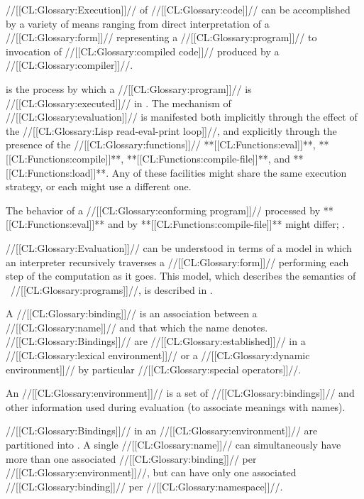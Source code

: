 


//[[CL:Glossary:Execution]]// of //[[CL:Glossary:code]]// can be accomplished by a variety of means ranging
from direct interpretation of a //[[CL:Glossary:form]]// representing a //[[CL:Glossary:program]]//
to invocation of //[[CL:Glossary:compiled code]]// produced by a //[[CL:Glossary:compiler]]//.
 
 is the process by which a //[[CL:Glossary:program]]// is //[[CL:Glossary:executed]]// in \clisp.
The mechanism of //[[CL:Glossary:evaluation]]// is manifested
 both implicitly through the effect of the //[[CL:Glossary:Lisp read-eval-print loop]]//,
 and  explicitly through the presence of the //[[CL:Glossary:functions]]// 
       **[[CL:Functions:eval]]**,
       **[[CL:Functions:compile]]**,
       **[[CL:Functions:compile-file]]**,
   and **[[CL:Functions:load]]**.
Any of these facilities might share the same execution strategy, 
or each might use a different one.

The behavior of a //[[CL:Glossary:conforming program]]// processed by **[[CL:Functions:eval]]**
and by **[[CL:Functions:compile-file]]** might differ; \seesection\SemanticConstraints.

//[[CL:Glossary:Evaluation]]// can be understood in terms of a model in which an
interpreter recursively traverses a //[[CL:Glossary:form]]// performing each
step of the computation as it goes.  
This model, which describes the semantics of \clisp\ //[[CL:Glossary:programs]]//,
is described in \secref\EvaluationModel.


A //[[CL:Glossary:binding]]// is an association between a //[[CL:Glossary:name]]// and
that which the name denotes.  //[[CL:Glossary:Bindings]]// are //[[CL:Glossary:established]]//
in a //[[CL:Glossary:lexical environment]]// or a //[[CL:Glossary:dynamic environment]]//
by particular //[[CL:Glossary:special operators]]//.

An //[[CL:Glossary:environment]]// is a set of //[[CL:Glossary:bindings]]// and other information
used during evaluation (\eg to associate meanings with names).

//[[CL:Glossary:Bindings]]// in an //[[CL:Glossary:environment]]// are partitioned into .
A single //[[CL:Glossary:name]]// can simultaneously have more than one
associated //[[CL:Glossary:binding]]// per //[[CL:Glossary:environment]]//,
but can have only one associated //[[CL:Glossary:binding]]// per //[[CL:Glossary:namespace]]//.




